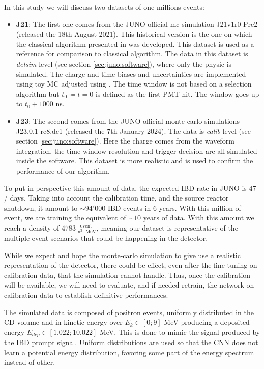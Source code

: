 \documentclass[../main.tex]{subfiles}
\begin{document}
In this study we will discuss two datasets of one millions events:
\begin{itemize}
  \item \textbf{J21}: The first one comes from the JUNO official mc simulation J21v1r0-Pre2 (released the 18th August 2021). This historical version is the one on which the classical algorithm presented in \cite{lebrin_towards_2022} was developed. This dataset is used as a reference for comparison to classical algorithm. The data in this dataset is \textit{detsim} level (see section \ref{sec:juno:software}), where only the physic is simulated. The charge and time biases and uncertainties are implemented using toy MC adjusted using \cite{cao_mass_2021, abusleme_mass_2022}. The time window is not based on a selection algorithm but $t_0 \coloneq t = 0$ is defined as the first PMT hit. The window goes up to $t_0 + 1000$ ns.
  \item \textbf{J23}: The second comes from the JUNO official monte-carlo simulations J23.0.1-rc8.dc1 (released the 7th January 2024). The data is \textit{calib} level (see section \ref{sec:juno:software}). Here the charge comes from the waveform integration, the time window resolution and trigger decision are all simulated inside the software. This dataset is more realistic and is used to confirm the performance of our algorithm.
\end{itemize}

To put in perspective this amount of data, the expected IBD rate in JUNO is 47 / days. Taking into account the calibration time, and the source reactor shutdown, it amount to $\sim 94'000$ IBD events in 6 years. With this million of event, we are training the equivalent of $\sim 10$ years of data. With this amount we reach a density of $4783 \frac{\mathrm{event}}{\mathrm{m}^3\cdot\mathrm{MeV}}$, meaning our dataset is representative of the multiple event scenarios that could be happening in the detector.

While we expect and hope the monte-carlo simulation to give use a realistic representation of the detector, there could be effect, even after the fine-tuning on calibration data, that the simulation cannot handle. Thus, once the calibration will be available, we will need to evaluate, and if needed retrain, the network on calibration data to establish definitive performances.

The simulated data is composed of positron events, uniformly distributed in the CD volume and in kinetic energy over $E_k \in [0; 9]$ MeV producing a deposited energy $E_{dep} \in [1.022; 10.022]$ MeV. This is done to mimic the signal produced by the IBD prompt signal. Uniform distributions are used so that the CNN does not learn a potential energy distribution, favoring some part of the energy spectrum instead of other.
\end{document}
